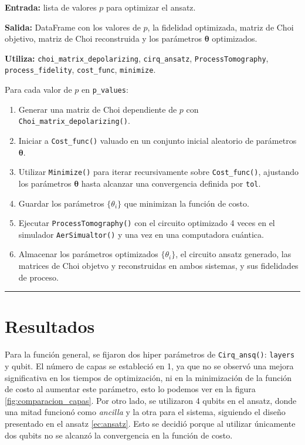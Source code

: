 \documentclass[letterpaper,12pt]{thesisECFM}
\theoremstyle{plain}
\theoremstyle{definition}
\theoremstyle{definition}
\theoremstyle{remark}
\newcommand{\1}{\mathbb{1}}
\begin{document}
\noindent\textbf{Entrada:} lista de valores $p$ para optimizar el ansatz.

\noindent\textbf{Salida:} DataFrame con los valores de $p$, la fidelidad
optimizada, matriz de Choi objetivo, matriz de Choi reconstruida y los
parámetros $\bm{\theta}$ optimizados.

\noindent\textbf{Utiliza:} \texttt{choi\_matrix\_depolarizing},
\texttt{cirq\_ansatz}, \texttt{ProcessTomography}, \texttt{process\_fidelity},
\texttt{cost\_func}, \texttt{minimize}. \newline

Para cada valor de $p$ en \texttt{p\_values}: 
\begin{enumerate}
    \item Generar una matriz de Choi dependiente de $p$ con \texttt{Choi\_matrix\_depolarizing()}.
    \item Iniciar a  \texttt{Cost\_func()} valuado en un conjunto inicial
aleatorio de parámetros $\bm{\theta}$. 
   \item Utilizar \texttt{Minimize()} para iterar recursivamente sobre
\texttt{Cost\_func()}, ajustando los parámetros $\bm{\theta}$ hasta alcanzar
una convergencia definida por \texttt{tol}.
   \item Guardar los parámetros $\{ \theta_i\}$ que minimizan la función de
costo. 
   \item Ejecutar \texttt{ProcessTomography()} con el circuito optimizado 4
veces en el simulador \texttt{AerSimualtor()} y una vez en una computadora
cuántica. 
    \item Almacenar los parámetros optimizados $\{ \theta_i\}$, el circuito
ansatz generado, las matrices de Choi objetvo y reconstruidas en ambos
sistemas, y sus fidelidades de proceso. 
\end{enumerate}
\vspace{-.5cm}
\noindent\rule{\textwidth}{1mm}
\section{Resultados} %
\label{sec:resultados_dp}
Para la función general, se fijaron dos hiper parámetros de
\texttt{Cirq\_ansq()}: \texttt{layers} y  qubit. El número de capas se
estableció en 1, ya que no se observó una mejora significativa en los tiempos
de optimización, ni en la minimización de la función de costo al aumentar este
parámetro, esto lo podemos ver en la figura \ref{fig:comparacion_capas}. Por
otro lado, se utilizaron 4 qubits en el ansatz, donde una mitad
funcionó como \textit{ancilla} y la otra para el sistema, siguiendo el diseño
presentado en el ansatz \ref{ec:ansatz}. Esto se decidió porque al
utilizar únicamente dos  qubits no se alcanzó la convergencia en la función de
costo. 
\end{document}
